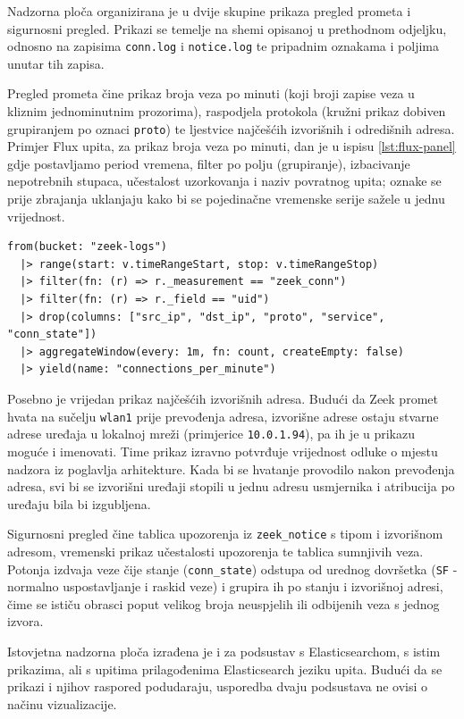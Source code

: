 Nadzorna ploča organizirana je u dvije skupine prikaza pregled prometa i sigurnosni pregled. Prikazi se temelje na shemi opisanoj u prethodnom odjeljku, odnosno na zapisima
\texttt{conn.log} i \texttt{notice.log} te pripadnim oznakama i poljima unutar tih zapisa.

Pregled prometa čine prikaz broja veza po minuti (koji broji zapise veza u kliznim jednominutnim prozorima), raspodjela protokola (kružni prikaz dobiven grupiranjem po oznaci
\texttt{proto}) te ljestvice najčešćih izvorišnih i odredišnih adresa. Primjer Flux upita, za prikaz broja veza po minuti, dan je u ispisu \ref{lst:flux-panel} gdje postavljamo 
period vremena, filter po polju (grupiranje), izbacivanje nepotrebnih stupaca, učestalost uzorkovanja i naziv povratnog upita; oznake se prije
zbrajanja uklanjaju kako bi se pojedinačne vremenske serije sažele u jednu vrijednost.

\begin{lstlisting}[caption={Flux upit prikaza broja veza po minuti}, label={lst:flux-panel}]
from(bucket: "zeek-logs")
  |> range(start: v.timeRangeStart, stop: v.timeRangeStop)
  |> filter(fn: (r) => r._measurement == "zeek_conn")
  |> filter(fn: (r) => r._field == "uid")
  |> drop(columns: ["src_ip", "dst_ip", "proto", "service", "conn_state"])
  |> aggregateWindow(every: 1m, fn: count, createEmpty: false)
  |> yield(name: "connections_per_minute")
\end{lstlisting}

Posebno je vrijedan prikaz najčešćih izvorišnih adresa. Budući da Zeek promet hvata na sučelju \texttt{wlan1} prije prevođenja adresa, izvorišne adrese ostaju stvarne adrese
uređaja u lokalnoj mreži (primjerice \texttt{10.0.1.94}), pa ih je u prikazu moguće i imenovati. Time prikaz izravno potvrđuje vrijednost odluke o mjestu nadzora iz poglavlja
arhitekture. Kada bi se hvatanje provodilo nakon prevođenja adresa, svi bi se izvorišni uređaji stopili u jednu adresu usmjernika i atribucija po uređaju bila bi izgubljena.

Sigurnosni pregled čine tablica upozorenja iz \texttt{zeek\_notice} s tipom i izvorišnom adresom, vremenski prikaz učestalosti upozorenja te tablica
sumnjivih veza. Potonja izdvaja veze čije stanje (\texttt{conn\_state}) odstupa od urednog dovršetka (\texttt{SF} - normalno uspostavljanje i raskid veze) i grupira ih po stanju i 
izvorišnoj adresi, čime se ističu obrasci poput velikog broja neuspjelih ili odbijenih veza s jednog izvora.

Istovjetna nadzorna ploča izrađena je i za podsustav s Elasticsearchom, s istim prikazima, ali s upitima prilagođenima Elasticsearch jeziku upita. Budući da se prikazi i njihov
raspored podudaraju, usporedba dvaju podsustava ne ovisi o načinu vizualizacije.

